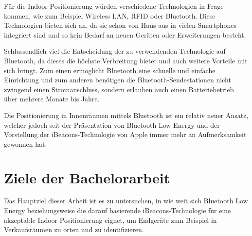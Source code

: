 Für die Indoor Positionierung würden verschiedene Technologien in Frage kommen, wie zum Beispiel Wireless LAN, RFID oder Bluetooth.
Diese Technologien bieten sich an, da sie schon von Haus aus in vielen Smartphones integriert sind und so kein Bedarf an neuen Geräten oder Erweiterungen besteht.



Schlussendlich viel die Entscheidung der zu verwendenden Technologie auf Bluetooth, da dieses die höchste Verbreitung bietet und auch weitere Vorteile mit sich bringt. Zum einen ermöglicht Bluetooth eine schnelle und einfache Einrichtung und zum anderen benötigen die Bluetooth-Sendestationen nicht zwingend einen Stromanschluss, sondern erlauben auch einen Batteriebetrieb über mehrere Monate bis Jahre.

Die Positionierung in Innenräumen mittels Bluetooth ist ein relativ neuer Ansatz, welcher jedoch seit der Präsentation von Bluetooth Low Energy und der Vorstellung der iBeacons-Technologie von Apple immer mehr an Aufmerksamkeit gewonnen hat. 

\section{Ziele der Bachelorarbeit}
\label{sec:introduction:goal}


Das Hauptziel dieser Arbeit ist es zu untersuchen, in wie weit sich Bluetooth Low Energy beziehungsweise die darauf basierende iBeacons-Technologie für eine akzeptable Indoor Positionierung eignet, um Endgeräte zum Beispiel in Verkaufsräumen zu orten und zu identifizieren.

